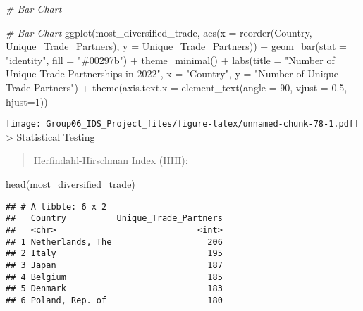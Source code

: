 \documentclass[
]{article}
\newenvironment{Shaded}{\begin{snugshade}}{\end{snugshade}}
\newcommand{\AttributeTok}[1]{\textcolor[rgb]{0.77,0.63,0.00}{#1}}
\newcommand{\CommentTok}[1]{\textcolor[rgb]{0.56,0.35,0.01}{\textit{#1}}}
\newcommand{\DecValTok}[1]{\textcolor[rgb]{0.00,0.00,0.81}{#1}}
\newcommand{\FloatTok}[1]{\textcolor[rgb]{0.00,0.00,0.81}{#1}}
\newcommand{\FunctionTok}[1]{\textcolor[rgb]{0.00,0.00,0.00}{#1}}
\newcommand{\NormalTok}[1]{#1}
\newcommand{\SpecialCharTok}[1]{\textcolor[rgb]{0.00,0.00,0.00}{#1}}
\newcommand{\StringTok}[1]{\textcolor[rgb]{0.31,0.60,0.02}{#1}}
\begin{document}
\begin{Shaded}
\begin{Highlighting}[]
\CommentTok{\# Bar Chart}


\CommentTok{\# Bar Chart}
\FunctionTok{ggplot}\NormalTok{(most\_diversified\_trade, }\FunctionTok{aes}\NormalTok{(}\AttributeTok{x =} \FunctionTok{reorder}\NormalTok{(Country, }\SpecialCharTok{{-}}\NormalTok{Unique\_Trade\_Partners), }\AttributeTok{y =}\NormalTok{ Unique\_Trade\_Partners)) }\SpecialCharTok{+}
  \FunctionTok{geom\_bar}\NormalTok{(}\AttributeTok{stat =} \StringTok{"identity"}\NormalTok{, }\AttributeTok{fill =} \StringTok{"\#00297b"}\NormalTok{) }\SpecialCharTok{+}
  \FunctionTok{theme\_minimal}\NormalTok{() }\SpecialCharTok{+}
  \FunctionTok{labs}\NormalTok{(}\AttributeTok{title =} \StringTok{"Number of Unique Trade Partnerships in 2022"}\NormalTok{,}
       \AttributeTok{x =} \StringTok{"Country"}\NormalTok{,}
       \AttributeTok{y =} \StringTok{"Number of Unique Trade Partners"}\NormalTok{) }\SpecialCharTok{+}
  \FunctionTok{theme}\NormalTok{(}\AttributeTok{axis.text.x =} \FunctionTok{element\_text}\NormalTok{(}\AttributeTok{angle =} \DecValTok{90}\NormalTok{, }\AttributeTok{vjust =} \FloatTok{0.5}\NormalTok{, }\AttributeTok{hjust=}\DecValTok{1}\NormalTok{))}
\end{Highlighting}
\end{Shaded}

\texttt{[image: Group06\_IDS\_Project\_files/figure-latex/unnamed-chunk-78-1.pdf]}
\textgreater{} Statistical Testing

\begin{quote}
Herfindahl-Hirschman Index (HHI):
\end{quote}

\begin{Shaded}
\begin{Highlighting}[]
\FunctionTok{head}\NormalTok{(most\_diversified\_trade)}
\end{Highlighting}
\end{Shaded}

\begin{verbatim}
## # A tibble: 6 x 2
##   Country          Unique_Trade_Partners
##   <chr>                            <int>
## 1 Netherlands, The                   206
## 2 Italy                              195
## 3 Japan                              187
## 4 Belgium                            185
## 5 Denmark                            183
## 6 Poland, Rep. of                    180
\end{verbatim}
\end{document}

